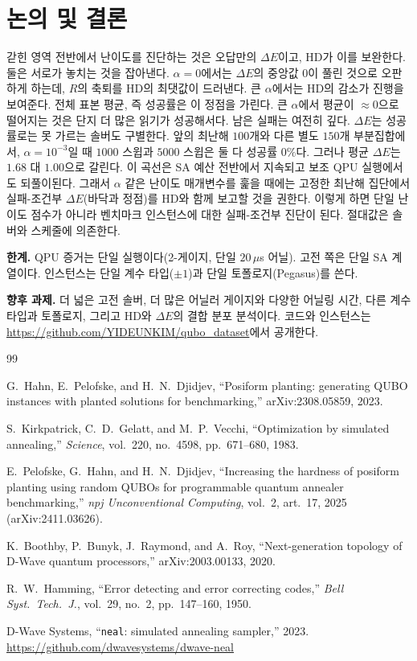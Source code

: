 \documentclass[10pt, conference]{IEEEtran}
\begin{document}
\section{논의 및 결론}
갇힌 영역 전반에서 난이도를 진단하는 것은 오답만의 $\Delta E$이고, HD가 이를
보완한다. 둘은 서로가 놓치는 것을 잡아낸다. $\alpha{=}0$에서는 $\Delta E$의 중앙값
$0$이 풀린 것으로 오판하게 하는데, $R$의 축퇴를 HD의 최댓값이 드러낸다. 큰
$\alpha$에서는 HD의 감소가 진행을 보여준다. 전체 표본 평균, 즉 성공률은 이 정점을
가린다. 큰 $\alpha$에서 평균이 $\approx0$으로 떨어지는 것은 단지 더 많은 읽기가
성공해서다. 남은 실패는 여전히 깊다. $\Delta E$는 성공률로는 못 가르는 솔버도
구별한다. 앞의 최난해 $100$개와 다른 별도 $150$개 부분집합에서, $\alpha{=}10^{-3}$일
때 $1000$ 스윕과 $5000$ 스윕은 둘 다 성공률 $0\%$다. 그러나 평균 $\Delta E$는
$1.68$ 대 $1.00$으로 갈린다. 이 곡선은 SA 예산 전반에서 지속되고 보조 QPU
실행에서도 되풀이된다. 그래서 $\alpha$ 같은 난이도 매개변수를 훑을 때에는 고정한
최난해 집단에서 실패-조건부 $\Delta E$(바닥과 정점)를 HD와 함께 보고할 것을
권한다. 이렇게 하면 단일 난이도 점수가 아니라 벤치마크 인스턴스에 대한 실패-조건부
진단이 된다. 절대값은 솔버와 스케줄에 의존한다.

\textbf{한계.} QPU 증거는 단일 실행이다(2-게이지, 단일 $20\,\mu$s 어닐). 고전
쪽은 단일 SA 계열이다. 인스턴스는 단일 계수 타입($\pm1$)과 단일
토폴로지(Pegasus)를 쓴다.

\textbf{향후 과제.} 더 넓은 고전 솔버, 더 많은 어닐러 게이지와 다양한 어닐링
시간, 다른 계수 타입과 토폴로지, 그리고 HD와 $\Delta E$의 결합 분포 분석이다.
코드와 인스턴스는 \url{https://github.com/YIDEUNKIM/qubo_dataset}에서
공개한다.


\begin{thebibliography}{99}

G.~Hahn, E.~Pelofske, and H.~N.~Djidjev,
``Posiform planting: generating QUBO instances with planted solutions for benchmarking,''
arXiv:2308.05859, 2023.

S.~Kirkpatrick, C.~D.~Gelatt, and M.~P.~Vecchi,
``Optimization by simulated annealing,''
\emph{Science}, vol.~220, no.~4598, pp.~671--680, 1983.

E.~Pelofske, G.~Hahn, and H.~N.~Djidjev,
``Increasing the hardness of posiform planting using random QUBOs for programmable quantum annealer benchmarking,''
\emph{npj Unconventional Computing}, vol.~2, art.~17, 2025
(arXiv:2411.03626).

K.~Boothby, P.~Bunyk, J.~Raymond, and A.~Roy,
``Next-generation topology of D-Wave quantum processors,''
arXiv:2003.00133, 2020.

R.~W.~Hamming, ``Error detecting and error correcting codes,''
\emph{Bell Syst.\ Tech.\ J.}, vol.~29, no.~2, pp.~147--160, 1950.

D-Wave Systems, ``\texttt{neal}: simulated annealing sampler,'' 2023.
\url{https://github.com/dwavesystems/dwave-neal}

\end{thebibliography}
\end{document}
